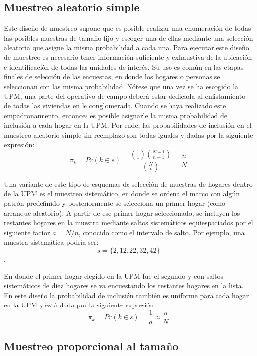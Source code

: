 \documentclass[12pt,spanish,]{book}
\begin{document}
\hypertarget{muestreo-aleatorio-simple}{%
\subsection*{Muestreo aleatorio simple}\label{muestreo-aleatorio-simple}}

Este diseño de muestreo supone que es posible realizar una enumeración de todas las posibles muestras de tamaño fijo y escoger una de ellas mediante una selección aleatoria que asigne la misma probabilidad a cada una. Para ejecutar este diseño de muestreo es necesario tener información suficiente y exhaustiva de la ubicación e identificación de todas las unidades de interés. Su uso es común en las etapas finales de selección de las encuestas, en donde los hogares o personas se seleccionan con las misma probabilidad. Nótese que una vez se ha escogido la UPM, una parte del operativo de campo deberá estar dedicada al enlistamiento de todas las viviendas en le conglomerado. Cuando se haya realizado este empadronamiento, entonces es posible asignarle la misma probabilidad de inclusión a cada hogar en la UPM. Por ende, las probabilidades de inclusión en el muestreo aleatorio simple sin reemplazo son todas iguales y dadas por la siguiente expresión:
\[\pi_k = Pr(k \in s) =  \frac{\binom{1}{1}\binom{N-1}{n-1}}{\binom{N}{k}} = \frac{n}{N}\]

Una variante de este tipo de esquemas de selección de muestras de hogares dentro de la UPM es el muestreo sistemático, en donde se ordena el marco con algún patrón predefinido y posteriormente se selecciona un primer hogar (como arranque aleatorio). A partir de ese primer hogar seleccionado, se incluyen los restantes hogares en la muestra mediante saltos sistemáticos equiespaciados por el siguiente factor \(a = N/n\), conocido como el intervalo de salto. Por ejemplo, una muestra sistemática podría ser:
\[s=\{2, 12, 22, 32, 42\}\].

En donde el primer hogar elegido en la UPM fue el segundo y con saltos sistemáticos de diez hogares se va encuestando los restantes hogares en la lista. En este diseño la probabilidad de inclusión también es uniforme para cada hogar en la UPM y está dada por la siguiente expresión
\[\pi_k = Pr(k \in s) = \frac{1}{a} \approx \frac{n}{N}\]

\hypertarget{muestreo-proporcional-al-tamano}{%
\subsection*{Muestreo proporcional al tamaño}\label{muestreo-proporcional-al-tamano}}
\end{document}

